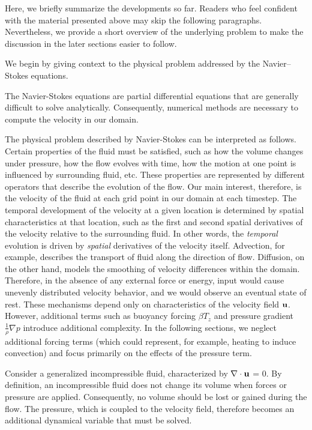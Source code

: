 Here, we briefly summarize the developments so far. Readers who feel
confident with the material presented above may skip the following
paragraphs. Nevertheless, we provide a short overview of the underlying
problem to make the discussion in the later sections easier to follow.

We begin by giving context to the physical problem addressed by the
Navier--Stokes equations.

The Navier-Stokes equations are partial differential equations that are
generally difficult to solve analytically. Consequently, numerical methods
are necessary to compute the velocity in our domain.

The physical problem described by Navier-Stokes can be interpreted as
follows. Certain properties of the fluid must be satisfied, such as how
the volume changes under pressure, how the flow evolves with time, how the
motion at one point is influenced by surrounding fluid, etc. These properties are represented by different operators that describe the evolution of the flow.
Our main interest, therefore, is the velocity of the fluid at each grid point in our domain at each timestep. The temporal development of the 
velocity at a given location is determined by spatial characteristics at
that location, such as the first and second spatial derivatives of the 
velocity relative to the surrounding fluid. In other words, the 
\textit{temporal} evolution is driven by \textit{spatial} derivatives of
the velocity itself. 
Advection, for example, describes the transport of fluid along the 
direction of flow. Diffusion, on the other hand, models the smoothing of
velocity differences within the domain. Therefore, in the absence of any
external force or energy, input would cause unevenly distributed velocity
behavior, and we would observe an eventual state of rest.
These mechanisms depend only on characteristics of the velocity field 
$\textbf u$. However, additional terms such as buoyancy forcing 
$\beta T_z$ and pressure gradient $\frac{1}{\rho}\nabla p$ introduce
additional complexity. In the following sections, we neglect additional
forcing terms (which could represent, for example, heating to induce
convection) and focus primarily on the effects of the pressure term.

Consider a generalized incompressible fluid, characterized by $\nabla 
\cdot \textbf u$ = 0. By definition, an incompressible fluid does not
change its volume when forces or pressure are applied. Consequently, no
volume should be lost or gained during the flow. The pressure, which is
coupled to the velocity field, therefore becomes an additional dynamical
variable that must be solved.


